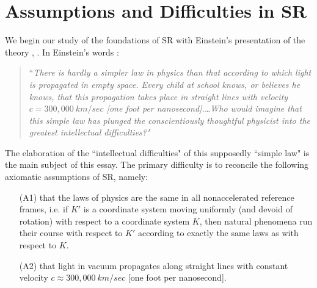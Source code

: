 \documentclass[12pt]{amsart}
\newcommand{\bR}{\mathbb{R}}
\newcommand{\del}{\partial}
\begin{document}








\section{Assumptions and Difficulties in SR}\label{s1}
We begin our study of the foundations of SR with Einstein's presentation of the theory \cite{einstein2019relativity}, \cite{einstein1905electrodynamics}. In Einstein's words \cite[Ch.7, 11]{einstein2019relativity}:

\begin{quote} 
``\emph{There is hardly a simpler law in physics than that according to which light is propagated in empty space. Every child at school knows, or believes he knows, that this propagation takes place in straight lines with velocity $c=300,000 ~km/sec$ [one foot per nanosecond].\ldots Who would imagine that this simple law has plunged the conscientiously thoughtful physicist into the greatest intellectual difficulties?"} 
\end{quote}

The elaboration of the ``intellectual difficulties" of this supposedly ``simple law" is the main subject of this essay. The primary difficulty is to reconcile the following axiomatic assumptions of SR, namely:
\begin{itemize}

\item[(A1)] that the laws of physics are the same in all nonaccelerated reference frames, i.e. if $K'$ is a coordinate system moving uniformly (and devoid of rotation) with respect to a coordinate system $K$, then natural phenomena run their course with respect to $K'$ according to exactly the same laws as with respect to $K$. 

\item[(A2)] that light in vacuum propagates along straight lines with constant velocity $c\approx 300,000 ~km/sec$ [one foot per nanosecond].

\end{itemize}
\end{document}
